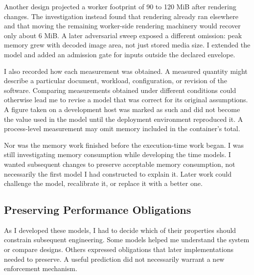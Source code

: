 Another design projected a worker footprint of 90 to 120 MiB after rendering changes. The investigation instead found that rendering already ran elsewhere and that moving the remaining worker-side rendering machinery would recover only about 6 MiB. A later adversarial sweep exposed a different omission: peak memory grew with decoded image area, not just stored media size. I extended the model and added an admission gate for inputs outside the declared envelope.

I also recorded how each measurement was obtained. A measured quantity might describe a particular document, workload, configuration, or revision of the software. Comparing measurements obtained under different conditions could otherwise lead me to revise a model that was correct for its original assumptions. A figure taken on a development host was marked as such and did not become the value used in the model until the deployment environment reproduced it. A process-level measurement may omit memory included in the container's total.

Nor was the memory work finished before the execution-time work began. I was still investigating memory consumption while developing the time models. I wanted subsequent changes to preserve acceptable memory consumption, not necessarily the first model I had constructed to explain it. Later work could challenge the model, recalibrate it, or replace it with a better one.


\subsection{Preserving Performance Obligations}\label{heading:what-carries-forward}

As I developed these models, I had to decide which of their properties should constrain subsequent engineering. Some models helped me understand the system or compare designs. Others expressed obligations that later implementations needed to preserve. A useful prediction did not necessarily warrant a new enforcement mechanism.


